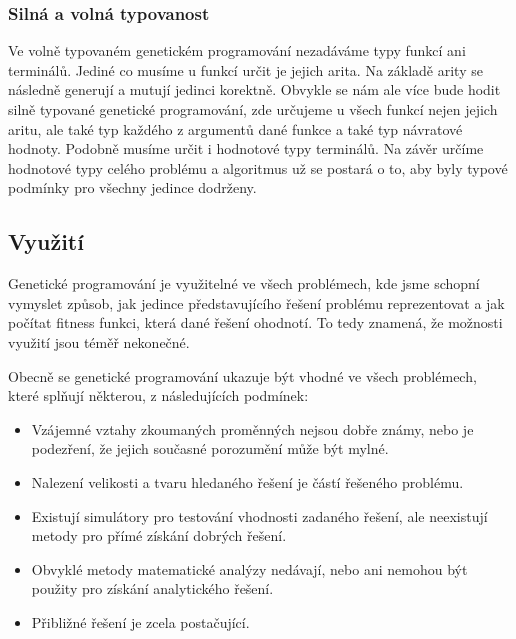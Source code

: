 \subsubsection{Silná a volná typovanost}
Ve volně typovaném genetickém programování nezadáváme typy funkcí ani terminálů. Jediné co musíme u funkcí určit je jejich arita. Na základě arity se následně generují a mutují jedinci korektně.
Obvykle se nám ale více bude hodit silně typované genetické programování, zde určujeme u všech funkcí nejen jejich aritu, ale také typ každého z argumentů dané funkce a také typ návratové hodnoty.
Podobně musíme určit i hodnotové typy terminálů.
Na závěr určíme hodnotové typy celého problému a algoritmus už se postará o to, aby byly typové podmínky pro všechny jedince dodrženy.
\cite{typedProgramming}


\subsection{Využití}
Genetické programování je využitelné ve všech problémech, kde jsme schopní vymyslet způsob, jak jedince představujícího řešení problému reprezentovat a jak počítat fitness funkci, která dané řešení ohodnotí.
To tedy znamená, že možnosti využití jsou téměř nekonečné. 

\cite{fieldGuideUsage}
Obecně se genetické programování ukazuje být vhodné ve všech problémech, které splňují některou, z následujících podmínek:

\begin{itemize}
    \item Vzájemné vztahy zkoumaných proměnných nejsou dobře známy, nebo je podezření, že jejich současné porozumění může být mylné.
    \item Nalezení velikosti a tvaru hledaného řešení je částí řešeného problému.
    \item Existují simulátory pro testování vhodnosti zadaného řešení, ale neexistují metody pro přímé získání dobrých řešení.
    \item Obvyklé metody matematické analýzy nedávají, nebo ani nemohou být použity pro získání analytického řešení.
    \item Přibližné řešení je zcela postačující.
    
\end{itemize}



